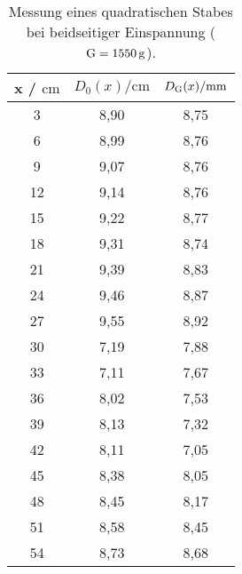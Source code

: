\sloppy
\begin{table}[H]
  \centering
  \caption{Messung eines quadratischen Stabes bei beidseitiger Einspannung ($\text G = \SI{1550}{\gram}$).}
  \label{tab:werte3}
  \begin{tabular}{c c c}
    \toprule
    x / $\si{\centi\meter} $ & $ D_0(x) / \si{\centi\meter}$ & $D_{\text G}(x) / \si{\milli\meter}$ \\
    \midrule
    3 & 8,90 & 8,75 \\
    6 & 8,99 & 8,76 \\
    9 & 9,07 & 8,76 \\
    12 & 9,14 & 8,76 \\
    15 & 9,22 & 8,77 \\
    18 & 9,31 & 8,74 \\
    21 & 9,39 & 8,83 \\
    24 & 9,46 & 8,87 \\
    27 & 9,55 & 8,92 \\
    30 & 7,19 & 7,88 \\
    33 & 7,11 & 7,67 \\
    36 & 8,02 & 7,53 \\
    39 & 8,13 & 7,32 \\
    42 & 8,11 & 7,05 \\
    45 & 8,38 & 8,05 \\
    48 & 8,45 & 8,17 \\
    51 & 8,58 & 8,45 \\
    54 & 8,73 & 8,68 \\
    \bottomrule
  \end{tabular}
\end{table}

